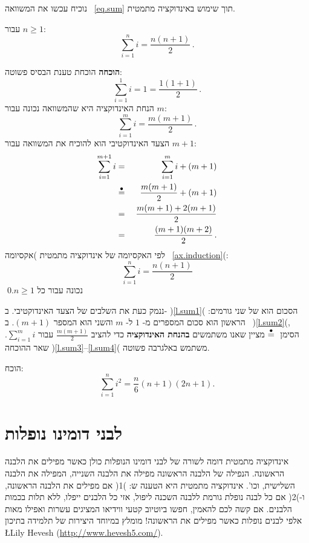 נוכיח עכשו את המשוואה~%
\ref{eq.sum}
תוך שימוש באינדוקציה מתמטית.
\begin{theorem}\label{t.sum}
עבור
$n\geq 1$:
\[
\sum_{i=1}^n i = \frac{n(n+1)}{2}\,.
\]
\end{theorem}
\textbf{הוכחה} 
הוכחת טענת הבסיס פשוטה:
\[
\sum_{i=1}^1 i = 1 =\frac{1(1+1)}{2}\,.
\]
הנחת האינדוקציה היא שהמשוואה נכונה עבור
$m$:
\[
\sum_{i=1}^{m} i = \frac{m(m+1)}{2}\,.
\]
הצעד האינדוקטיבי הוא להוכיח את המשוואה עבור
$m+1$:
\begin{eqnarray}
\sum_{i=1}^{m+1} i &=& \sum_{i=1}^m i + (m+1)\label{l.sum1}\\
&\stackrel{\bullet}{=}{}&\frac{m(m+1)}{2} + (m+1)\label{l.sum2}\\
&=&\frac{m(m+1) + 2(m+1)}{2}\label{l.sum3}\\
&=&\frac{(m+1)(m+2)}{2}\,.\label{l.sum4}
\end{eqnarray}
לפי האקסיומה של אינדוקציה מתמטית )אקסיומה~%
\ref{ax.induction}(:
\[
\sum_{i=1}^n i = \frac{n(n+1)}{2}
\]
נכונה עבור כל
$n\geq 1$.\qed

ננמק כעת את השלבים של הצעד האינדוקטיבי. ב-%
)\ref{l.sum1}(
הסכום הוא של שני גורמים: הראשון הוא סכום המספרים מ-%
$1$
ל-%
$m$
והשני הוא המספר
$(m+1)$.
ב~%
)\ref{l.sum2}(,
הסימן
$\stackrel{\bullet}{=}{}$
מציין שאנו משתמשים
\textbf{בהנחת האינדוקציה}
כדי להציב
$\frac{m(m+1)}{2}$
עבור
$\sum_{i=1}^m i$.
שאר ההוכחה
)\ref{l.sum3}--\ref{l.sum4}(
משתמש באלגרבה פשוטה.

\begin{exercise}
הוכח:
\[
\sum_{i=1}^n i^2 = \frac{n}{6}(n+1)(2n+1).
\]
\end{exercise}

\begin{center}
\end{center}

\begin{center}
\end{center}

\section{%
לבני דומינו נופלות%
}

אינדוקציה מתמטית דומה לשורה של לבני דומינו הנופלות כולן כאשר מפילים את הלבנה הראשונה. הנפילה של הלבנה הראשונה מפילה את הלבנה השנייה, המפילה את הלבנה השלישית, וכו'. אינדוקציה מתמטית היא הטענה ש: )1( אם מפילים את הלבנה הראשונה, ו-)2( אם כל לבנה נופלת גורמת ללבנה השכנה ליפול, אזי כל הלבנים ייפלו, ללא תלות בכמות הלבנים. אם קשה לכם להאמין, חפשו ביוטיוב קטעי ווידיאו המציגים עשרות ואפילו מאות אלפי לבנים נופלות כאשר מפילים את הראשונה! מומלץ במיוחד היצירות של תלמידה בתיכון\\
\L{Lily Hevesh (\url{http://www.hevesh5.com/})}.

